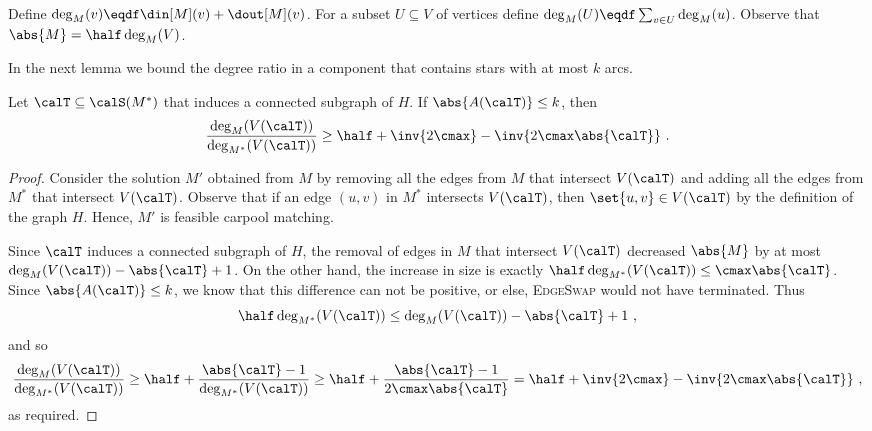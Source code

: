 
Define $\deg_M(v) \eqdf \din[M](v) + \dout[M](v)$.  For a subset
$U \subseteq V$ of vertices define $\deg_M(U) \eqdf \sum_{v \in
U} \deg_M(u)$.
%
Observe that $\abs{M} = \half \deg_M(V)$.

In the next lemma we bound the degree ratio in a component that
contains stars with at most $k$ arcs.

\begin{lemma}
\label{lemma:r}
Let $\calT \subseteq \calS(M^*)$ that induces a connected subgraph of
$H$.  If $\abs{A(\calT)} \leq k$, then
\[
\frac{\deg_M(V(\calT))}{\deg_{M^*}(V(\calT))} 
\geq \half + \inv{2\cmax} - \inv{2\cmax\abs{\calT}}
~.
\]
\end{lemma}
\begin{proof}
Consider the solution $M'$ obtained from $M$ by removing all the
edges from $M$ that intersect $V(\calT)$ and adding all the edges from
$M^*$ that intersect $V(\calT)$.  Observe that if an edge $(u,v)$ in
$M^*$ intersects $V(\calT)$, then $\set{u,v} \in V(\calT)$ by the
definition of the graph $H$.  Hence, $M'$ is feasible carpool
matching.

Since $\calT$ induces a connected subgraph of $H$, the removal of
edges in $M$ that intersect $V(\calT)$ decreased $\abs{M}$ by at most
$\deg_M(V(\calT)) - \abs{\calT} + 1$.
%
On the other hand, the increase in size is exactly
 $\half \deg_{M^*}(V(\calT)) \leq \cmax \abs{\calT}$.
%
Since $\abs{A(\calT)} \leq k$, we know that this difference can not be
positive, or else, \textsc{EdgeSwap} would not have terminated.  Thus
\[
\half \deg_{M^*}(V(\calT)) \leq \deg_M(V(\calT)) - \abs{\calT} + 1
~,
\]
and so
\[
\frac{\deg_M(V(\calT))}{\deg_{M^*}(V(\calT))}
\geq \half + \frac{\abs{\calT} - 1}{\deg_{M^*}(V(\calT))}
\geq \half + \frac{\abs{\calT} - 1}{2\cmax \abs{\calT}}
=    \half + \inv{2\cmax} - \inv{2\cmax \abs{\calT}}
~,
\]
as required.
\end{proof}





